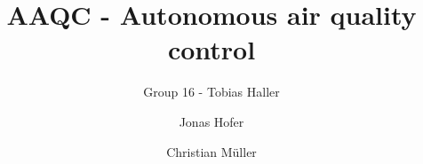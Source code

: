 \documentclass[runningheads]{llncs}
\begin{document}
%
    \title{AAQC - Autonomous air quality control}


    \author{Group 16 - Tobias Haller \and Jonas Hofer \and Christian M\"uller}


%
    \maketitle              %
%
%    


    
    
    
    
    


%
%
%
%

\end{document}
